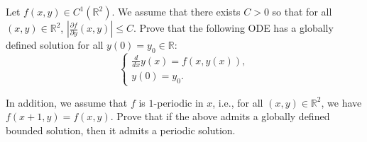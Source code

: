 \begin{exercise}
\label{analysis:2022:6}
Let $f(x,y)\in C^1(\mathbb{R}^2)$. We assume that there exists $C>0$ so that for all $(x,y)\in\mathbb{R}^2$, $|\frac{\partial f}{\partial y}(x,y)|\leq C$. Prove that the following ODE has a globally defined solution for all $y(0)=y_0\in\mathbb{R}$:
\[
\begin{cases}
\frac{d}{dx}y(x) = f(x,y(x)),\\
y(0) = y_0.
\end{cases}
\]

In addition, we assume that $f$ is $1$-periodic in $x$, i.e., for all $(x,y)\in\mathbb{R}^2$, we have $f(x+1,y)=f(x,y)$. Prove that if the above admits a globally defined bounded solution, then it admits a periodic solution.
\end{exercise}

